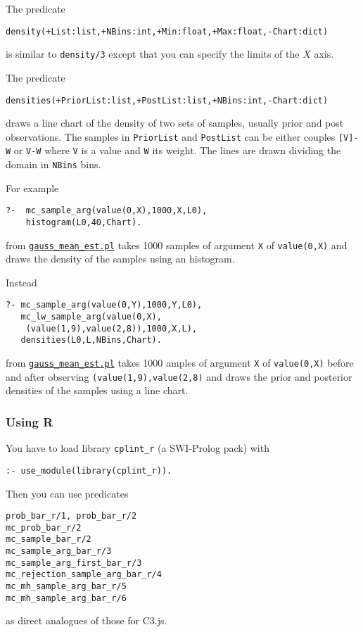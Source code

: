 The predicate
\begin{verbatim}
density(+List:list,+NBins:int,+Min:float,+Max:float,-Chart:dict) 
\end{verbatim}
is similar to \verb|density/3| except that you can specify the limits of the $X$ axis.

The predicate
\begin{verbatim}
densities(+PriorList:list,+PostList:list,+NBins:int,-Chart:dict)
\end{verbatim}
draws a line chart of the density of two sets of samples, usually
 prior and post observations. The samples in \verb|PriorList| and \verb|PostList|
can be either couples \verb|[V]-W| or \verb|V-W| where \verb|V| is a value and \verb|W| its weight.
 The lines are drawn dividing the domain in
 \verb|NBins| bins.
 
For example
\begin{verbatim}
?-  mc_sample_arg(value(0,X),1000,X,L0),
    histogram(L0,40,Chart).
\end{verbatim}
from \href{http://cplint.lamping.unife.it/example/inference/gauss_mean_est.pl}{\texttt{gauss\_mean\_est.pl}}
takes 1000 samples of argument \verb|X| of \verb|value(0,X)| and draws the density of the samples using an histogram.

Instead
\begin{verbatim}
?- mc_sample_arg(value(0,Y),1000,Y,L0),
   mc_lw_sample_arg(value(0,X),
    (value(1,9),value(2,8)),1000,X,L),
   densities(L0,L,NBins,Chart).
\end{verbatim}
from \href{http://cplint.lamping.unife.it/example/inference/gauss_mean_est.pl}{\texttt{gauss\_mean\_est.pl}}
takes 1000 amples of argument \verb|X| of \verb|value(0,X)| before and after observing
\verb|(value(1,9),value(2,8)| and draws the prior and posterior densities of the samples using a line chart.

\subsubsection{Using R}
You have to load library \texttt{cplint\_r}  (a SWI-Prolog pack) with
\begin{verbatim}
:- use_module(library(cplint_r)).
\end{verbatim}
Then you can use predicates 
\begin{verbatim}
prob_bar_r/1, prob_bar_r/2
mc_prob_bar_r/2
mc_sample_bar_r/2
mc_sample_arg_bar_r/3
mc_sample_arg_first_bar_r/3
mc_rejection_sample_arg_bar_r/4
mc_mh_sample_arg_bar_r/5
mc_mh_sample_arg_bar_r/6
\end{verbatim}
as direct analogues of those for C3.js.

